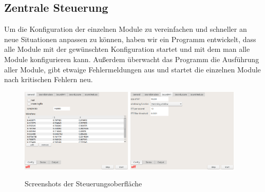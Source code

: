 \subsection{Zentrale Steuerung}
Um die Konfiguration der einzelnen Module zu vereinfachen und schneller an neue Situationen anpassen zu können, haben wir ein Programm entwickelt, dass alle Module mit der gewünschten Konfiguration startet und mit dem man alle Module konfigurieren kann. Außerdem überwacht das Programm die Ausführung aller Module, gibt etwaige Fehlermeldungen aus und startet die einzelnen Module nach kritischen Fehlern neu.
\begin{figure}[H]
    \centering
    \includegraphics[width=0.475\textwidth]{img/GUI}
    \hfill
    \includegraphics[width=0.475\textwidth]{img/GUI2}
    \caption{Screenshots der Steuerungsoberfläche\label{fig:gui_screenshot}}
\end{figure}
